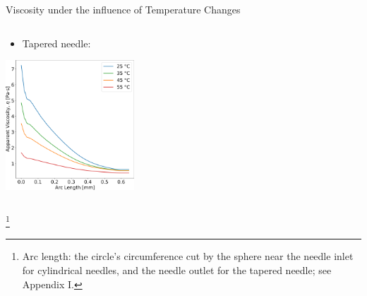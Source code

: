 \begin{frame}{Viscosity under the influence of Temperature Changes}
\begin{columns}
\begin{column}{.333\textwidth}
\begin{itemize}
    \item Tapered needle:
\end{itemize}
\vspace{0.5mm}
\centering
\includegraphics[trim = 0mm 0mm 0mm 0mm, clip, width=1.9in]{./images/tapered_nudata_sphere.png}
\end{column}
\end{columns}

{\let\thefootnote\relax\footnote{{Arc length: the circle’s circumference cut by the sphere near the needle inlet for cylindrical needles, and the needle outlet for the tapered needle; see Appendix I.}}}
\end{frame}


